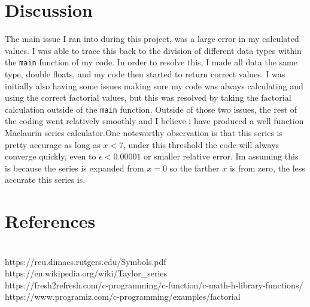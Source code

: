 \documentclass[11pt]{report}
\newcommand{\code}[1]{\colorbox{light-gray}{\texttt{#1}}}
\begin{document}
\section{Discussion}
The main issue I ran into during this project, was a large error in my calculated values. I was able to trace this back to the division of different data types within the \code{main} function of my code. In order to resolve this, I made all data the same type, double floats, and my code then started to return correct values. I was initially also having some issues making sure my code was always calculating and using the correct factorial values, but this was resolved by taking the factorial calculation outside of the \code{main} function. Outside of those two issues, the rest of the coding went relatively smoothly and I believe i have produced a well function Maclaurin series calculator.One noteworthy observation is that this series is pretty accurage as long as $x < 7$, under this threshold the code will always converge quickly, even to $\epsilon < 0.00001$ or smaller relative error. Im assuming this is because the series is expanded from $x=0$ so the farther $x$ is from zero, the less accurate this series is.
\newpage
\section{References}
\\ https://reu.dimacs.rutgers.edu/Symbols.pdf
\\ https://en.wikipedia.org/wiki/Taylor\_series
\\ https://fresh2refresh.com/c-programming/c-function/c-math-h-library-functions/
\\ https://www.programiz.com/c-programming/examples/factorial
\end{document}
